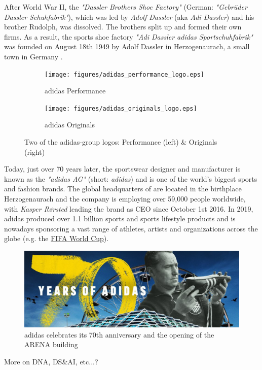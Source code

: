 

After World War II, the \textit{"Dassler Brothers Shoe Factory"} (German: \textit{"Gebrüder Dassler Schuhfabrik"}), which was led by \textit{Adolf Dassler} (aka \textit{Adi Dassler}) and his brother Rudolph, was dissolved. The brothers split up and formed their own firms. As a result, the sports shoe factory \textit{"Adi Dassler adidas Sportschuhfabrik"} was founded on August 18th 1949 by Adolf Dassler in Herzogenaurach, a small town in Germany \citep{adidas-group}.

\begin{figure}[H]
\centering
\begin{subfigure}{.4\textwidth}
  \centering
  \texttt{[image: figures/adidas\_performance\_logo.eps]}
  \caption{adidas Performance}
  \label{fig:adidas_performance_logo}
\end{subfigure}
\begin{subfigure}{.4\textwidth}
  \centering
  \texttt{[image: figures/adidas\_originals\_logo.eps]}
  \caption{adidas Originals}
  \label{fig:adidas_originals_logo}
\end{subfigure}
\caption{Two of the adidas-group logos: Performance (left) \& Originals (right) \\ \citep{adidasmediacenter}}
\label{fig:adidas_logos}
\end{figure}


Today, just over 70 years later, the sportswear designer and manufacturer is known as the \textit{"adidas AG"} (short: \textit{adidas}) and is one of the world's biggest sports and fashion brands. The global headquarters of are located in the birthplace Herzogenaurach and the company is employing over 59,000 people worldwide, with \textit{Kasper R\o rsted} leading the brand as CEO since October 1st 2016. In 2019, adidas produced over 1.1 billion sports and sports lifestyle products and is nowadays sponsoring a vast range of athletes, artists and organizations across the globe (e.g. the  \href{https://www.fifa.com/worldcup/}{FIFA World Cup\texttrademark}).

\begin{figure}[H]
\centering
  \includegraphics[width=.95\linewidth]{figures/adidas_70_years.eps}
  \caption{adidas celebrates its 70th anniversary and the opening of the ARENA building \citep{adidas70years}}
  \label{fig:adidas_70_years}
\end{figure}


More on  DNA, DS\&AI, etc...?